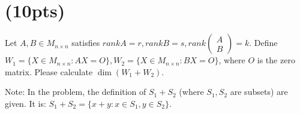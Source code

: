 \documentclass{article}
\begin{document}
\section{(10pts)}
Let $A,B\in M_{n\times n}$ satisfies $rank A=r,rank B=s,rank \begin{pmatrix}
    A\\B
\end{pmatrix}=k$. Define $W_1=\{X\in M_{n\times n}: AX=O\},W_2=\{X\in M_{n\times n}: BX=O\}$, where $O$ is the zero matrix. Please calculate $\dim(W_1+W_2)$.

Note: In the problem, the definition of $S_1+S_2$ (where $S_1,S_2$ are subsets) are given. It is: $S_1+S_2=\{x+y:x\in S_1,y\in S_2\}$.
\end{document}
